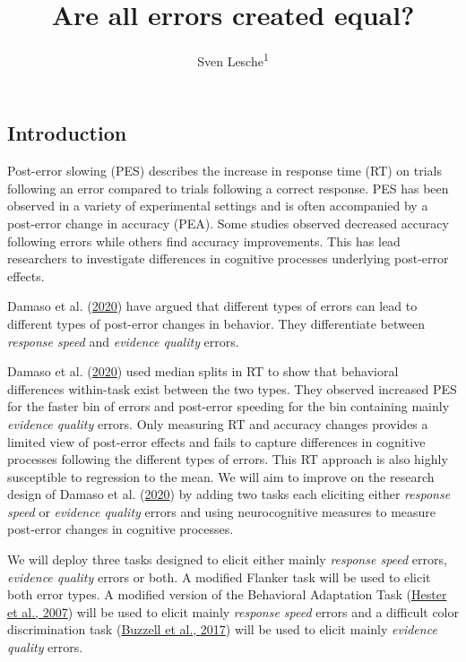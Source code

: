 \documentclass[
  man,floatsintext]{apa7}
\title{Are all errors created equal?}
\author{Sven Lesche\textsuperscript{1}}
\date{}
\affiliation{\vspace{0.5cm}\textsuperscript{1} Ruprecht-Karls-University Heidelberg}
\begin{document}
\maketitle

\hypertarget{introduction}{%
\subsection{Introduction}\label{introduction}}

Post-error slowing (PES) describes the increase in response time (RT) on trials following an error compared to trials following a correct response. PES has been observed in a variety of experimental settings and is often accompanied by a post-error change in accuracy (PEA). Some studies observed decreased accuracy following errors while others find accuracy improvements. This has lead researchers to investigate differences in cognitive processes underlying post-error effects.

Damaso et al. (\protect\hyperlink{ref-damaso2020}{2020}) have argued that different types of errors can lead to different types of post-error changes in behavior. They differentiate between \emph{response speed} and \emph{evidence quality} errors.

Damaso et al. (\protect\hyperlink{ref-damaso2020}{2020}) used median splits in RT to show that behavioral differences within-task exist between the two types. They observed increased PES for the faster bin of errors and post-error speeding for the bin containing mainly \emph{evidence quality} errors. Only measuring RT and accuracy changes provides a limited view of post-error effects and fails to capture differences in cognitive processes following the different types of errors. This RT approach is also highly susceptible to regression to the mean. We will aim to improve on the research design of Damaso et al. (\protect\hyperlink{ref-damaso2020}{2020}) by adding two tasks each eliciting either \emph{response speed} or \emph{evidence quality} errors and using neurocognitive measures to measure post-error changes in cognitive processes.

We will deploy three tasks designed to elicit either mainly \emph{response speed} errors, \emph{evidence quality} errors or both. A modified Flanker task will be used to elicit both error types. A modified version of the Behavioral Adaptation Task (\protect\hyperlink{ref-hester2007post}{Hester et al., 2007}) will be used to elicit mainly \emph{response speed} errors and a difficult color discrimination task (\protect\hyperlink{ref-buzzell2017error}{Buzzell et al., 2017}) will be used to elicit mainly \emph{evidence quality} errors.
\end{document}
